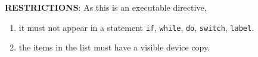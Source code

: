 {\bf RESTRICTIONS}: As this is an executable directive,
\begin{enumerate}
\item it must not appear in a statement \verb!if!, \verb!while!,
  \verb!do!, \verb!switch!, \verb!label!.
\item the items in the list must have a visible device copy. 
\end{enumerate}



